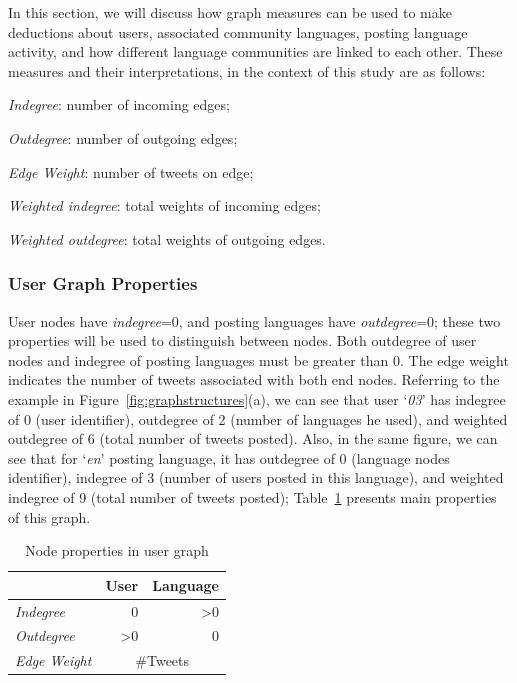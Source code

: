 \documentclass{llncs}
\begin{document}
In this section, we will discuss how graph measures can be used to
make deductions about users, associated community languages, posting
language activity, and how different language communities are linked
to each other.  These measures and their interpretations, in the
context of this study are as follows:\\

\begin{compactitem}
\item \emph{Indegree}: number of incoming edges;
\item \emph{Outdegree}: number of outgoing edges;
\item \emph{Edge Weight}: number of tweets on edge;
\item \emph{Weighted indegree}: total weights of incoming edges;
\item \emph{Weighted outdegree}: total weights of outgoing edges.
\end{compactitem}

\subsubsection{User Graph Properties}

User nodes have {\emph{indegree}}=0, and posting languages have
{\emph{outdegree}}=0; these two properties will be used to distinguish
between nodes. Both outdegree of user nodes and indegree of posting
languages must be greater than 0. The edge weight indicates the number
of tweets associated with both end nodes. Referring to the example in
Figure~\ref{fig:graphstructures}(a), we can see that user
`{\emph{03}}' has indegree of 0 (user identifier), outdegree of 2
(number of languages he used), and weighted outdegree of 6 (total
number of tweets posted). Also, in the same figure, we can see that
for `{\emph{en}}' posting language, it has outdegree of 0 (language
nodes identifier), indegree of 3 (number of users posted in this
language), and weighted indegree of 9 (total number of tweets posted);
Table~\ref{tbl:usersgraph} presents main properties of this graph.

\begin{table}[htb]
\centering
\caption{Node properties in user graph}
\begin{tabular}{@{}lrr@{}}
\toprule
\textbf{}& \textbf{User} & \textbf{Language} \\ \midrule
{\emph{Indegree}} & 0 & \textgreater0 \\
{\emph{Outdegree}} & \textgreater0 & 0 \\ 
{\emph{Edge Weight}}& \multicolumn{2}{c}{\#Tweets}\\ \bottomrule
\end{tabular}
\label{tbl:usersgraph}
\vspace{-2em}
\end{table}
\end{document}
